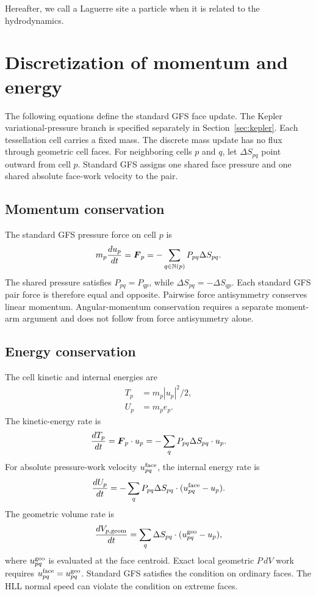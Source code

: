 \documentclass[twocolumn]{aastex63}
\newcommand{\vel}{{u}}
\newcommand{\surf}[0]{S}
\begin{document}
Hereafter, we call a Laguerre site a particle when it is related to the hydrodynamics.




\section{Discretization of momentum and energy}
The following equations define the standard GFS face update. The Kepler
variational-pressure branch is specified separately in
Section~\ref{sec:kepler}.
Each tessellation cell carries a fixed mass. The discrete mass update has no
flux through geometric cell faces. For neighboring cells $p$ and $q$, let
$\Delta\surf_{pq}$ point outward from cell $p$. Standard GFS assigns one
shared face pressure and one shared absolute face-work velocity to the pair.

\subsection{Momentum conservation}
The standard GFS pressure force on cell $p$ is
\begin{equation}\label{eq:force}
  m_p{d\vel_p\over dt}
  =\boldsymbol{F}_p
  =-\sum_{q\in\mathbb{N}(p)}P_{pq}\Delta\surf_{pq}.
\end{equation}
The shared pressure satisfies $P_{pq}=P_{qp}$, while
$\Delta\surf_{pq}=-\Delta\surf_{qp}$. Each standard GFS pair force is
therefore equal and opposite. Pairwise force antisymmetry conserves linear
momentum. Angular-momentum conservation requires a separate moment-arm
argument and does not follow from force antisymmetry alone.

\subsection{Energy conservation}
The cell kinetic and internal energies are
\begin{equation*}
\begin{aligned}
  T_p&=m_p|\vel_p|^2/2,\\
  U_p&=m_p e_p.
\end{aligned}
\end{equation*}
The kinetic-energy rate is
\begin{equation}
  {dT_p\over dt}=\boldsymbol{F}_p\cdot\vel_p
  =-\sum_q P_{pq}\Delta\surf_{pq}\cdot\vel_p.
\end{equation}
For absolute pressure-work velocity $\vel_{pq}^{\rm face}$, the internal
energy rate is
\begin{equation}
  {dU_p\over dt}
  =-\sum_qP_{pq}\Delta\surf_{pq}\cdot
    (\vel_{pq}^{\rm face}-\vel_p).
\end{equation}
The geometric volume rate is
\begin{equation}
  {dV_{p,\rm geom}\over dt}
  =\sum_q\Delta\surf_{pq}\cdot
    (\vel_{pq}^{\rm geo}-\vel_p),
\end{equation}
where $\vel_{pq}^{\rm geo}$ is evaluated at the face centroid. Exact local
geometric $P\,dV$ work requires
$\vel_{pq}^{\rm face}=\vel_{pq}^{\rm geo}$. Standard GFS satisfies the
condition on ordinary faces. The HLL normal speed can violate the condition
on extreme faces.
\end{document}
